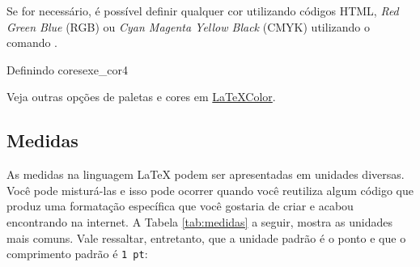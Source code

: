 Se for necessário, é possível definir qualquer cor utilizando códigos HTML, \textit{Red Green Blue} (RGB) ou \textit{Cyan Magenta Yellow Black} (CMYK) utilizando o comando \texttt{\definecolor}.

\begin{texexptitled}[breakable,center lower,enhanced,middle=2mm]{Definindo cores}{exe_cor4}

\end{texexptitled}

\begin{marker}
Veja outras opções de paletas e cores em \href{http://latexcolor.com}{LaTeXColor}.
\end{marker}

\subsection{Medidas}
\label{sec:medidas}

As medidas na linguagem LaTeX podem ser apresentadas em unidades diversas. Você pode misturá-las e isso pode ocorrer quando você reutiliza algum código que produz uma formatação específica que você gostaria de criar e acabou encontrando na internet. A Tabela \ref{tab:medidas} a seguir, mostra as unidades mais comuns. Vale ressaltar, entretanto, que a unidade padrão é o ponto e que o comprimento padrão é \texttt{1 pt}:

